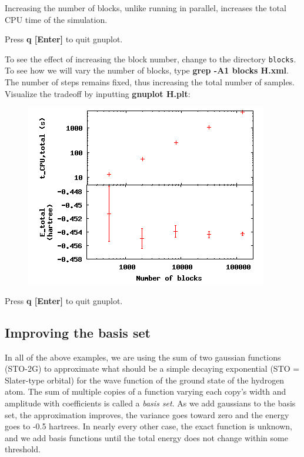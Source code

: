 
Increasing the number of blocks, unlike running in parallel, increases the
total CPU time of the simulation.  

Press \textbf{q [Enter]} to quit gnuplot.

To see the effect of increasing the block number, change to the directory
\texttt{blocks}. To see how we will vary the number of blocks, type
\textbf{grep -A1 blocks H.xml}.  The number of steps remains fixed, thus
increasing the total number of samples.   Visualize the tradeoff by inputting
\textbf{gnuplot H.plt}: 

\FloatBarrier
\begin{figure}[ht!]
\begin{center}
\includegraphics[trim = 0mm 0mm 0mm 0mm, clip,width=0.75\columnwidth]{figures/lab_qmc_statistics_blocks.png}
\end{center}
\end{figure}
\FloatBarrier


Press \textbf{q [Enter]} to quit gnuplot.

\subsection{Improving the basis set}

In all of the above examples, we are using the sum of two gaussian functions
(STO-2G) to approximate what should be a simple decaying exponential (STO =
Slater-type orbital) for the wave function of the ground state of the hydrogen
atom.  The sum of multiple copies of a function varying each copy's width and
amplitude with coefficients is called a \textit{basis set}. As we add gaussians
to the basis set, the approximation improves, the variance goes toward zero and
the energy goes to -0.5 hartrees.  In nearly every other case, the exact
function is unknown, and we add basis functions until the total energy does not
change within some threshold.

